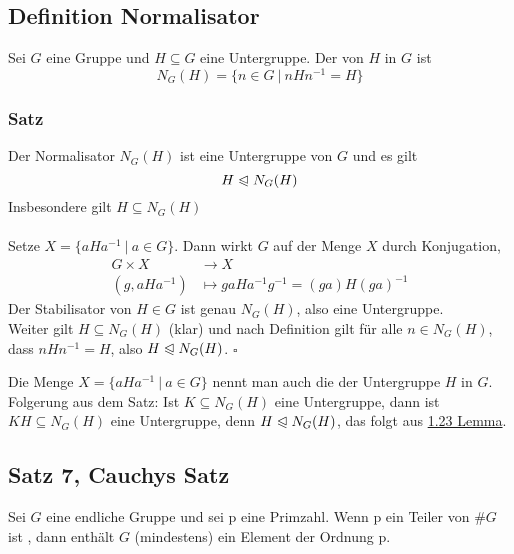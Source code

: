 \subsection{Definition Normalisator}
\label{sub:def_normalisator}
Sei $G$ eine Gruppe und $H\subseteq G$ eine Untergruppe. Der  von $H$ in $G$ ist \[N_G(H)=\{n\in G ~|~nHn^{-1}=H\} \]

\subsubsection*{Satz}
Der Normalisator $N_G(H)$ ist eine Untergruppe von $G$ und es gilt \[H\trianglelefteqslant N_G(H) \] Insbesondere gilt $H\subseteq N_G(H)$\\

\\
Setze $X=\{aHa^{-1}~|~a\in G \}$. Dann wirkt $G$ auf der Menge $X$ durch Konjugation,
\begin{equation*}
\begin{aligned}
	G\times X &\to X\\
	(g,aHa^{-1}) &\mapsto gaHa^{-1}g^{-1}=(ga)H(ga)^{-1}
\end{aligned}
\end{equation*}
Der Stabilisator von $H\in G$ ist genau $N_G(H)$, also eine Untergruppe.\\
Weiter gilt $H\subseteq N_G(H)$ (klar) und nach Definition gilt für alle $n\in N_G(H)$, dass $nHn^{-1}=H$, also $H\trianglelefteqslant N_G(H)$.
\hfill $\square$

Die Menge $X=\{aHa^{-1}~|~a\in G \}$ nennt man auch die  der Untergruppe $H$ in $G$.\\
Folgerung aus dem Satz: Ist $K\subseteq N_G(H)$ eine Untergruppe, dann ist $KH\subseteq N_G(H)$ eine Untergruppe, denn $H\trianglelefteqslant N_G(H)$, das folgt aus \hyperref[sub:isomorphiesätze]{1.23 Lemma}.

\subsection{Satz 7, Cauchys Satz}
\label{sub:cauchys_satz}
Sei $G$ eine endliche Gruppe und sei p eine Primzahl. Wenn p ein Teiler von $\#G$ ist , dann enthält $G$ (mindestens) ein Element der Ordnung p.\\

